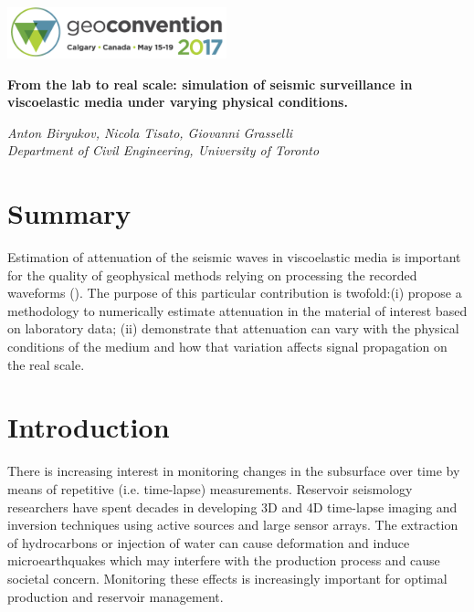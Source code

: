 \documentclass[letterpaper,11pt]{article}
\begin{document}

\begin{center}
\includegraphics[width=2.5in]{header.png} \vspace{-1pt}
\end{center}

\begin{flushleft}
{\LARGE
\begin{spacing}{0.9}
\textbf{From the lab to real scale: simulation of seismic surveillance in viscoelastic media under varying physical conditions.}
\end{spacing}
}

\textit{Anton Biryukov, Nicola Tisato, Giovanni Grasselli} \\
\textit{Department of Civil Engineering, University of Toronto}
\end{flushleft}

\section*{Summary}
Estimation of attenuation of the seismic waves in viscoelastic media is important for the quality of geophysical methods relying on processing the recorded waveforms (\cite{marelli_appraisal_2010,madonna_new_2013,nicola_tisato_seismic_2014}).
The purpose of this particular contribution is twofold:(i) propose a methodology to numerically estimate attenuation in the material of interest based on laboratory data; (ii) demonstrate that attenuation can vary with the physical conditions of the medium and how that variation affects signal propagation on the real scale.

\section*{Introduction}
There is increasing interest in monitoring changes in the subsurface over time by means of repetitive (i.e. time-lapse) measurements. %
Reservoir seismology researchers have spent decades in developing 3D and 4D time-lapse imaging and inversion techniques using active sources and large sensor arrays. 
The extraction of hydrocarbons or injection of water can cause deformation and induce microearthquakes which may interfere with the production process and cause societal concern. Monitoring these effects is increasingly important for optimal production and reservoir management. 
\end{document}
